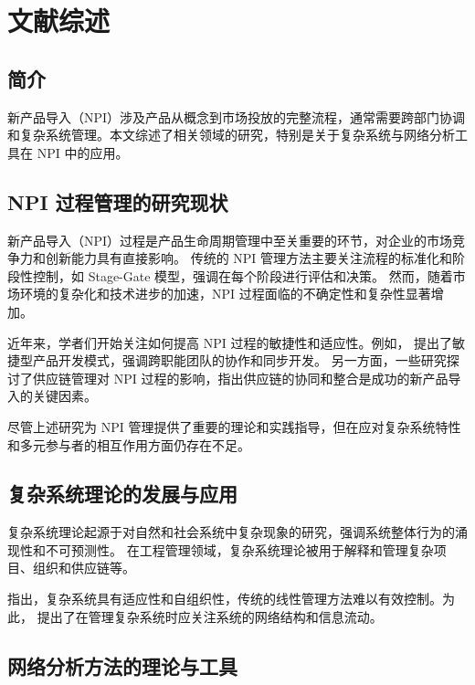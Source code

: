 \chapter{文献综述}

\section*{简介}

新产品导入（NPI）涉及产品从概念到市场投放的完整流程，通常需要跨部门协调和复杂系统管理。本文综述了相关领域的研究，特别是关于复杂系统与网络分析工具在 NPI 中的应用。

\section{NPI 过程管理的研究现状}

新产品导入（NPI）过程是产品生命周期管理中至关重要的环节，对企业的市场竞争力和创新能力具有直接影响\citep{kusumanoKimCLARKTakahiro1992}。
传统的 NPI 管理方法主要关注流程的标准化和阶段性控制，如 Stage-Gate 模型\citep{cooper1990stage}，强调在每个阶段进行评估和决策。
然而，随着市场环境的复杂化和技术进步的加速，NPI 过程面临的不确定性和复杂性显著增加\citep{kim2002managing}。

近年来，学者们开始关注如何提高 NPI 过程的敏捷性和适应性。例如，\citet{takeuchi1986new} 提出了敏捷型产品开发模式，强调跨职能团队的协作和同步开发。
另一方面，一些研究探讨了供应链管理对 NPI 过程的影响，指出供应链的协同和整合是成功的新产品导入的关键因素\citep{vanechteltManagingSupplierInvolvement2008}。

尽管上述研究为 NPI 管理提供了重要的理论和实践指导，但在应对复杂系统特性和多元参与者的相互作用方面仍存在不足。

\section{复杂系统理论的发展与应用}

复杂系统理论起源于对自然和社会系统中复杂现象的研究，强调系统整体行为的涌现性和不可预测性\citep{anderson1972more}。
在工程管理领域，复杂系统理论被用于解释和管理复杂项目、组织和供应链等\citep{maylor2008managing}。

\citet{holland2006studying} 指出，复杂系统具有适应性和自组织性，传统的线性管理方法难以有效控制。为此，\citet{cilliers1998complexity} 
提出了在管理复杂系统时应关注系统的网络结构和信息流动。

\section{网络分析方法的理论与工具}

